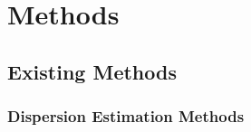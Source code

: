\documentclass[10pt]{article}
\begin{document}


\section*{Methods}

\subsection*{Existing Methods}

\subsubsection*{Dispersion Estimation Methods} \label{sec:disp}
\end{document}
